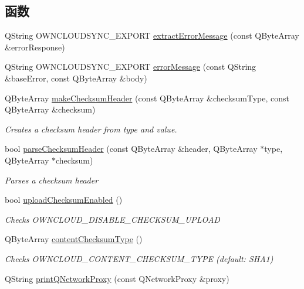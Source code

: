 \subsection*{函数}
\begin{DoxyCompactItemize}
\item 
Q\+String O\+W\+N\+C\+L\+O\+U\+D\+S\+Y\+N\+C\+\_\+\+E\+X\+P\+O\+RT \hyperlink{namespace_o_c_c_aa531e89c99df730480bf0da12d7da153}{extract\+Error\+Message} (const Q\+Byte\+Array \&error\+Response)
\item 
Q\+String O\+W\+N\+C\+L\+O\+U\+D\+S\+Y\+N\+C\+\_\+\+E\+X\+P\+O\+RT \hyperlink{namespace_o_c_c_a6388eb0c5d2f85e5085e09bf16a93d1b}{error\+Message} (const Q\+String \&base\+Error, const Q\+Byte\+Array \&body)
\item 
Q\+Byte\+Array \hyperlink{namespace_o_c_c_a2f13fc062a188027ffc2939363bcb37f}{make\+Checksum\+Header} (const Q\+Byte\+Array \&checksum\+Type, const Q\+Byte\+Array \&checksum)
\begin{DoxyCompactList}\small\item\em Creates a checksum header from type and value. \end{DoxyCompactList}\item 
bool \hyperlink{namespace_o_c_c_a4d9ed0cd51d8709a9253e00f2f203cab}{parse\+Checksum\+Header} (const Q\+Byte\+Array \&header, Q\+Byte\+Array $\ast$type, Q\+Byte\+Array $\ast$checksum)
\begin{DoxyCompactList}\small\item\em Parses a checksum header \end{DoxyCompactList}\item 
bool \hyperlink{namespace_o_c_c_aa7010e2fa7bcdda9e53981df6d8efb3c}{upload\+Checksum\+Enabled} ()
\begin{DoxyCompactList}\small\item\em Checks O\+W\+N\+C\+L\+O\+U\+D\+\_\+\+D\+I\+S\+A\+B\+L\+E\+\_\+\+C\+H\+E\+C\+K\+S\+U\+M\+\_\+\+U\+P\+L\+O\+AD \end{DoxyCompactList}\item 
Q\+Byte\+Array \hyperlink{namespace_o_c_c_a6341c56b4b72b2fcc60449285f9f7c38}{content\+Checksum\+Type} ()
\begin{DoxyCompactList}\small\item\em Checks O\+W\+N\+C\+L\+O\+U\+D\+\_\+\+C\+O\+N\+T\+E\+N\+T\+\_\+\+C\+H\+E\+C\+K\+S\+U\+M\+\_\+\+T\+Y\+PE (default\+: S\+H\+A1) \end{DoxyCompactList}\item 
Q\+String \hyperlink{namespace_o_c_c_a77a59794911e4e3a4515c279ac82477a}{print\+Q\+Network\+Proxy} (const Q\+Network\+Proxy \&proxy)

\end{DoxyCompactItemize}
